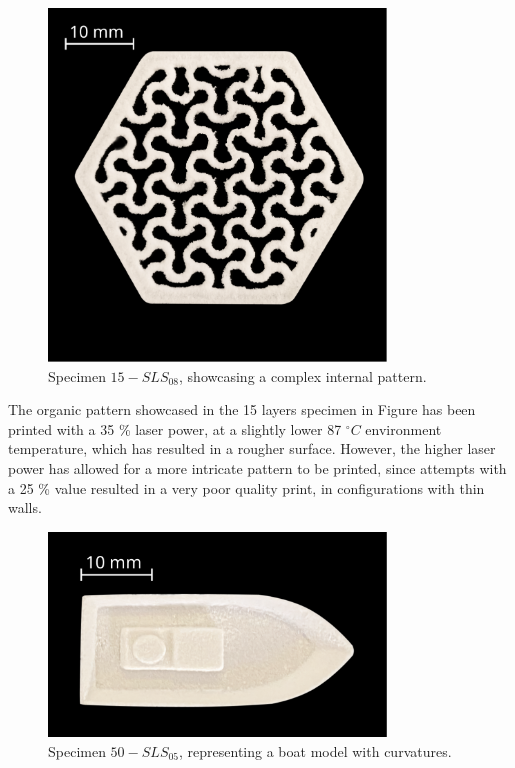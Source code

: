 \documentclass[a4paper]{article}
\begin{document}
        \begin{figure}[H]
            \centering
            \includegraphics[width=0.8\textwidth]{Pictures/Printed_parts/Fixed/Fixed_New/organic_pattern.pdf}
            \caption{Specimen $15-SLS_{08}$, showcasing a complex internal pattern.}
            \label{fig:printed_specimens_organicpattern}
        \end{figure}

        The organic pattern showcased in the 15 layers specimen in Figure  has been printed with a 35 \% laser
        power, at a slightly lower 87 $^{\circ}C$ environment temperature, which has resulted in a rougher surface. However, the higher 
        laser power has allowed for a more intricate pattern to be printed, since attempts with a 25 \% value resulted in a very poor quality print, 
        in configurations with thin walls. 

        \begin{figure}[H]
            \centering
            \includegraphics[width=0.8\textwidth]{Pictures/Printed_parts/Fixed/Fixed_New/boat.pdf}
            \caption{Specimen $50-SLS_{05}$, representing a boat model with curvatures.}
            \label{fig:printed_specimens_boat}
        \end{figure}
\end{document}
